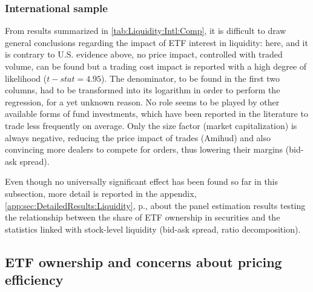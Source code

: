 \begin{landscape}
  {\linespread{1.0}
    \begin{table}[htbp]
      
    \end{table}
  }
\end{landscape}

\subsubsection{International sample}
From results summarized in \autoref{tab:Liquidity:Intl:Comp}, it is difficult to draw general conclusions regarding the impact of ETF interest in liquidity: here, and it is contrary to U.S. evidence above, no price impact, controlled with traded volume, can be found but a trading cost impact is reported with a high degree of likelihood ($\mathit{t-stat} = 4.95$). The \textcite{Amihud2002} denominator, to be found in the first two columns, had to be transformed into its logarithm in order to perform the regression, for a yet unknown reason. No role seems to be played by other available forms of fund investments, which have been reported in the literature to trade less frequently on average. Only the size factor (market capitalization) is always negative, reducing the price impact of trades (Amihud) and also convincing more dealers to compete for orders, thus lowering their margins (bid-ask spread).

\bigskip
Even though no universally significant effect has been found so far in this subsection, more detail is reported in the appendix, \autoref{app:sec:DetailedResults:Liquidity}, p.\pageref{app:sec:DetailedResults:Liquidity},  about the panel estimation results testing the relationship between the share of ETF ownership in securities and the statistics linked with stock-level liquidity (bid-ask spread, \textcite{Amihud2002} ratio decomposition). 

\begin{landscape}
  {\linespread{1.0}
    \begin{table}[htbp]
      
    \end{table}
  }
\end{landscape}
\subsection{ETF ownership and concerns about pricing efficiency}
\label{sec:Results:sub:Efficiency}
